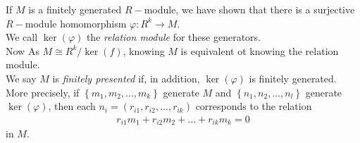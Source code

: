 \documentclass[a4paper]{article}
\begin{document}
\begin{defi}
If $M$ is a finitely generated $R-$module, we have shown that there is a surjective $R-$module homomorphism $\varphi: R^k \to M$.\\
We call $\ker\left(\varphi\right)$ the \emph{relation module} for these generators.\\
Now As $M \cong R^k/\ker(f)$, knowing $M$ is equivalent ot knowing the relation module.\\
We say $M$ is \emph{finitely presented} if, in addition, $\ker\left(\varphi\right)$ is finitely generated.\\
More precisely, if $\left\{m_1, m_2, ... ,m_k\right\}$ generate $M$ and $\left\{n_1,n_2,...,n_l\right\}$ generate $\ker\left(\varphi\right)$, then each $n_i = \left(r_{i1},r_{i2},...,r_{ik}\right)$ corresponds to the relation
\begin{equation*}
\begin{aligned}
r_{i1} m_1 + r_{i2} m_2 + ... + r_{ik} m_k = 0
\end{aligned}
\end{equation*}
in $M$.
\end{defi}
\end{document}
